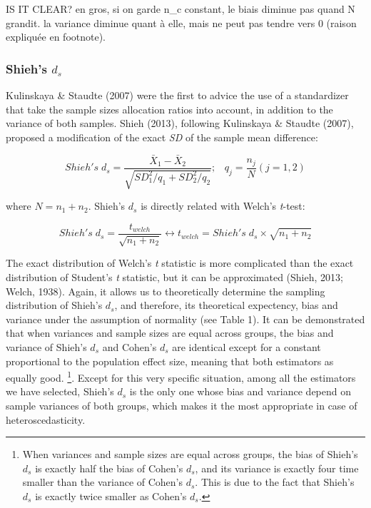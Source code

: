 \documentclass[
  man,floatsintext]{apa6}
\begin{document}
IS IT CLEAR? en gros, si on garde n\_c constant, le biais diminue pas quand N grandit. la variance diminue quant à elle, mais ne peut pas tendre vers 0 (raison expliquée en footnote).

\hypertarget{shiehs-d_s}{%
\subsubsection{\texorpdfstring{Shieh's \(d_s\)}{Shieh's d\_s}}\label{shiehs-d_s}}

Kulinskaya \& Staudte (2007) were the first to advice the use of a standardizer that take the sample sizes allocation ratios into account, in addition to the variance of both samples. Shieh (2013), following Kulinskaya \& Staudte (2007), proposed a modification of the exact \emph{SD} of the sample mean difference:

\begin{equation} 
Shieh's \; d_s = \frac{\bar{X}_1 - \bar{X}_2}{\sqrt{SD_1^2/q_1+SD_2^2/q_2}}; \;\;\; q_j=\frac{n_j}{N} (j=1,2)
\label{eq:Shiehds}
\end{equation}

where \(N = n_1+n_2\). Shieh's \(d_{s}\) is directly related with Welch's \emph{t}-test:

\begin{equation} 
Shieh's \; d_s = \frac{t_{welch}}{\sqrt{n_1+n_2}} \leftrightarrow t_{welch} = Shieh's \; d_s \times \sqrt{n_1+n_2}
\label{eq:shiehvswelch}
\end{equation}

The exact distribution of Welch's \emph{t} statistic is more complicated than the exact distribution of Student's \emph{t} statistic, but it can be approximated (Shieh, 2013; Welch, 1938). Again, it allows us to theoretically determine the sampling distribution of Shieh's \(d_s\), and therefore, its theoretical expectency, bias and variance under the assumption of normality (see Table 1). It can be demonstrated that when variances and sample sizes are equal across groups, the bias and variance of Shieh's \(d_s\) and Cohen's \(d_s\) are identical except for a constant proportional to the population effect size, meaning that both estimators as equally good. \footnote{When variances and sample sizes are equal across groups, the bias of Shieh's $d_s$ is exactly half the bias of Cohen's $d_s$, and its variance is exactly four time smaller than the variance of Cohen's $d_s$. This is due to the fact that Shieh's $d_s$ is exactly twice smaller as Cohen's $d_s$.}. Except for this very specific situation, among all the estimators we have selected, Shieh's \(d_s\) is the only one whose bias and variance depend on sample variances of both groups, which makes it the most appropriate in case of heteroscedasticity.
\end{document}
